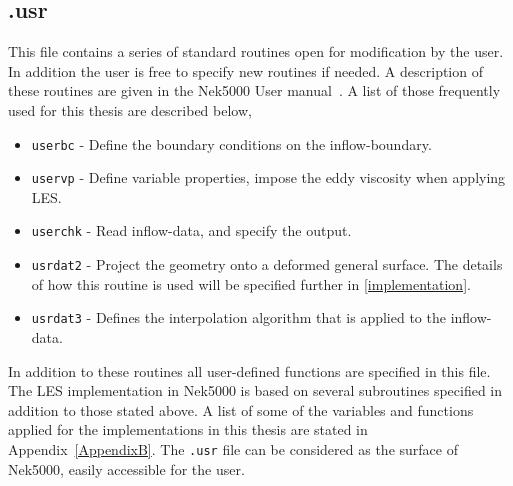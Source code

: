 \subsection{.usr}
This file contains a series of standard routines open for modification by the user. In addition the user is free to specify 
new routines if needed. A description of these routines are given in the Nek5000 User manual~\cite{Nek}. A list of those 
frequently used for this thesis are described below, 
%
%
\begin{itemize}
    \item \verb|userbc| - Define the boundary conditions on the inflow-boundary. 
    \item \verb|uservp| - Define variable properties, impose the eddy viscosity when applying LES. 
    \item \verb|userchk| - Read inflow-data, and specify the output.
    \item \verb|usrdat2| - Project the geometry onto a deformed general surface. The details of how this routine is used will be 
    specified further in \cref{implementation}. 
    \item \verb|usrdat3| - Defines the interpolation algorithm that is applied to the inflow-data. 
\end{itemize}
%
In addition to these routines all user-defined functions are specified in this file. The LES implementation in Nek5000 is based
on several subroutines specified in addition to those stated above. A list of some of the variables and functions 
applied for the implementations in this thesis are stated in Appendix~\ref{AppendixB}.
The \verb|.usr| file can be considered as the surface of Nek5000, easily accessible for the user.

